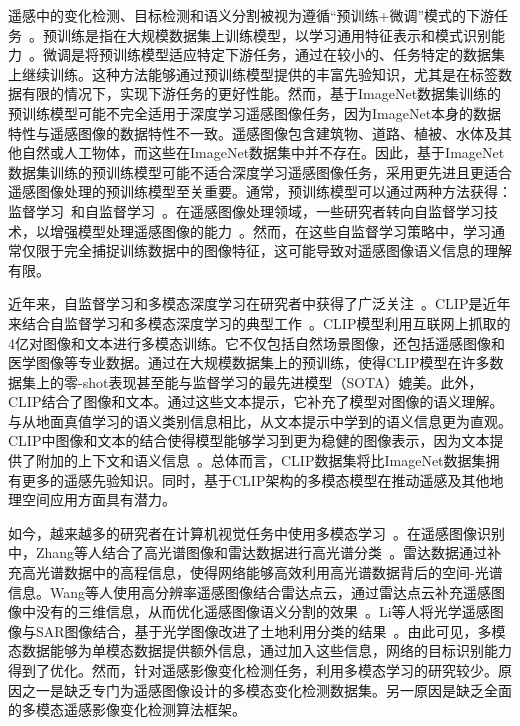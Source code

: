 遥感中的变化检测、目标检测和语义分割被视为遵循“预训练+微调”模式的下游任务~\cite{Liu2018DeepLF,Yosinski2014HowTA}。预训练是指在大规模数据集上训练模型，以学习通用特征表示和模式识别能力~\cite{chen2023continuous,Deng2009ImageNetAL}。微调是将预训练模型适应特定下游任务，通过在较小的、任务特定的数据集上继续训练。这种方法能够通过预训练模型提供的丰富先验知识，尤其是在标签数据有限的情况下，实现下游任务的更好性能。然而，基于ImageNet数据集训练的预训练模型可能不完全适用于深度学习遥感图像任务，因为ImageNet本身的数据特性与遥感图像的数据特性不一致。遥感图像包含建筑物、道路、植被、水体及其他自然或人工物体，而这些在ImageNet数据集中并不存在。因此，基于ImageNet数据集训练的预训练模型可能不适合深度学习遥感图像任务，采用更先进且更适合遥感图像处理的预训练模型至关重要。通常，预训练模型可以通过两种方法获得：监督学习~\cite{He2015DeepRL}和自监督学习~\cite{Chen2020ASF,he_masked_2021}。在遥感图像处理领域，一些研究者转向自监督学习技术，以增强模型处理遥感图像的能力~\cite{Chen2022SemanticAwareDR,Chen2022ASA, Li2021GlobalAL}。然而，在这些自监督学习策略中，学习通常仅限于完全捕捉训练数据中的图像特征，这可能导致对遥感图像语义信息的理解有限。

近年来，自监督学习和多模态深度学习在研究者中获得了广泛关注~\cite{Audebert2017BeyondRV,He2019MomentumCF}。CLIP是近年来结合自监督学习和多模态深度学习的典型工作~\cite{Radford2021LearningTV}。CLIP模型利用互联网上抓取的4亿对图像和文本进行多模态训练。它不仅包括自然场景图像，还包括遥感图像和医学图像等专业数据。通过在大规模数据集上的预训练，使得CLIP模型在许多数据集上的零-shot表现甚至能与监督学习的最先进模型（SOTA）媲美。此外，CLIP结合了图像和文本。通过这些文本提示，它补充了模型对图像的语义理解。与从地面真值学习的语义类别信息相比，从文本提示中学到的语义信息更为直观。CLIP中图像和文本的结合使得模型能够学习到更为稳健的图像表示，因为文本提供了附加的上下文和语义信息~\cite{Rao2021DenseCLIPLD}。总体而言，CLIP数据集将比ImageNet数据集拥有更多的遥感先验知识。同时，基于CLIP架构的多模态模型在推动遥感及其他地理空间应用方面具有潜力。

如今，越来越多的研究者在计算机视觉任务中使用多模态学习~\cite{Deng2021TransVGEV,Liang2022LocalGlobalCA, Yi2021CCAFFMNetDS}。在遥感图像识别中，Zhang等人结合了高光谱图像和雷达数据进行高光谱分类~\cite{Zhang2023MultimodalAC}。雷达数据通过补充高光谱数据中的高程信息，使得网络能够高效利用高光谱数据背后的空间-光谱信息。Wang等人使用高分辨率遥感图像结合雷达点云，通过雷达点云补充遥感图像中没有的三维信息，从而优化遥感图像语义分割的效果~\cite{Wang2022ACC}。Li等人将光学遥感图像与SAR图像结合，基于光学图像改进了土地利用分类的结果~\cite{Li2022MCANetAJ}。由此可见，多模态数据能够为单模态数据提供额外信息，通过加入这些信息，网络的目标识别能力得到了优化。然而，针对遥感影像变化检测任务，利用多模态学习的研究较少。原因之一是缺乏专门为遥感图像设计的多模态变化检测数据集。另一原因是缺乏全面的多模态遥感影像变化检测算法框架。

